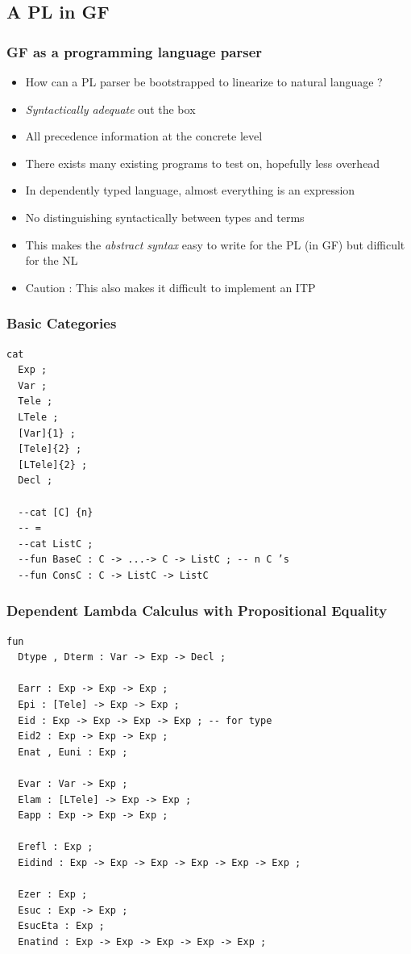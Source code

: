 \documentclass[9pt]{beamer}
\begin{document}
\subsection{A PL in GF}

\begin{frame}
\frametitle{GF as a programming language parser}

\begin{itemize}
\item How can a PL parser be bootstrapped to linearize to natural language ?
\item \emph{Syntactically adequate} out the box
\item All precedence information at the concrete level
\item There exists many existing programs to test on, hopefully less
  overhead 
\item In dependently typed language, almost everything is an expression \\
\item No distinguishing syntactically between types and terms
\item This makes the \emph{abstract syntax} easy to write for the PL (in GF) but difficult for the NL
\item Caution : This also makes it difficult to implement an ITP
\end{itemize}
\end{frame}


\begin{frame}[fragile]
\frametitle{Basic Categories}
\begin{verbatim}
cat
  Exp ;
  Var ;
  Tele ;
  LTele ;
  [Var]{1} ;
  [Tele]{2} ;
  [LTele]{2} ;
  Decl ;

  --cat [C] {n}
  -- =
  --cat ListC ;
  --fun BaseC : C -> ...-> C -> ListC ; -- n C ’s
  --fun ConsC : C -> ListC -> ListC
\end{verbatim}
\end{frame}

\begin{frame}[fragile]

\frametitle{Dependent Lambda Calculus with Propositional Equality}

\begin{verbatim}
fun
  Dtype , Dterm : Var -> Exp -> Decl ; 

  Earr : Exp -> Exp -> Exp ;
  Epi : [Tele] -> Exp -> Exp ;
  Eid : Exp -> Exp -> Exp -> Exp ; -- for type
  Eid2 : Exp -> Exp -> Exp ;
  Enat , Euni : Exp ;

  Evar : Var -> Exp ;
  Elam : [LTele] -> Exp -> Exp ;
  Eapp : Exp -> Exp -> Exp ;

  Erefl : Exp ;
  Eidind : Exp -> Exp -> Exp -> Exp -> Exp -> Exp ;

  Ezer : Exp ;
  Esuc : Exp -> Exp ;
  EsucEta : Exp ; 
  Enatind : Exp -> Exp -> Exp -> Exp -> Exp ;
\end{verbatim}
\end{frame}
\end{document}
